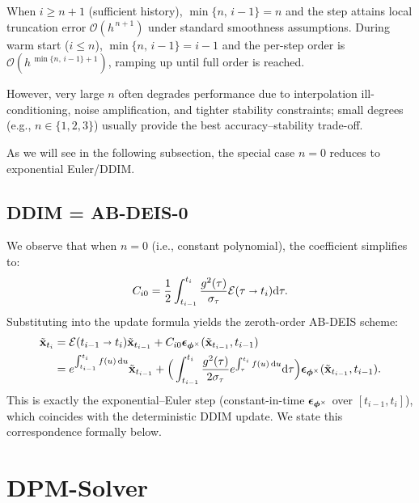 When $i\ge n{+}1$ (sufficient history), $\min\{n,\, i-1\}=n$
and the step attains local truncation error $\mathcal O(h^{\,n+1})$ under standard smoothness assumptions.
During warm start ($i\le n$), $\min\{n,\, i-1\}=i-1$ and the per-step order is $\mathcal O(h^{\,\min\{n,\, i-1\}+1})$, ramping up
until full order is reached. 

However, very large $n$ often degrades performance due to interpolation ill-conditioning, noise amplification, and tighter stability constraints; small degrees (e.g., $n \in \{1,2,3\}$) usually provide the best accuracy--stability trade-off.

As we will see in the following subsection, the special case $n{=}0$ reduces to exponential Euler/DDIM.



\subsection{DDIM = AB-DEIS-0}\label{sec:ddim-deis} We observe that when $ n = 0 $ (i.e., constant polynomial), the coefficient simplifies to:
\[
C_{i0} = \frac{1}{2} \int_{t_{i-1}}^{t_{i}} \frac{g^2(\tau)}{\sigma_\tau} \mathcal{E}(\tau \shortrightarrow t_i)   \mathrm{d}\tau.
\]
Substituting into the update formula yields the zeroth-order AB-DEIS scheme:
\begin{align}\label{eq:deis-0}
  \tilde{{\mathbf{x}}}_{t_{i}} &=  \mathcal{E}(t_{i-1} \shortrightarrow t_{i})\tilde{{\mathbf{x}}}_{t_{i-1}} + C_{i0} \bm{\epsilon}_{\bm{\phi}^\times}(\tilde{{\mathbf{x}}}_{t_{i-1}}, t_{i-1})\nonumber\\
  &=e^{\int_{t_{i-1}}^{t_{i}}f(u)\mathop{}\!\mathrm{d} u} \tilde{{\mathbf{x}}}_{t_{i-1}} + \Big( \int_{t_{i-1}}^{t_{i}} \frac{g^2(\tau)}{2\sigma_\tau} e^{\int_{\tau}^{t_{i}}f(u)\mathop{}\!\mathrm{d} u}   \mathrm{d}\tau
\Big) \bm{\epsilon}_{\bm{\phi}^\times}(\tilde{{\mathbf{x}}}_{t_{i-1}}, t_{i-1}).  
\end{align}
This is exactly the exponential–Euler step (constant-in-time ${\bm{\epsilon}}_{{\bm{\phi}}^\times}$ over $[t_{i-1},t_i]$), which
coincides with the deterministic DDIM update. We state this correspondence formally below.


    
\clearpage
\newpage



\section{\texorpdfstring{DPM-Solver}{DPM-Solver}}\label{sec:dpm}

